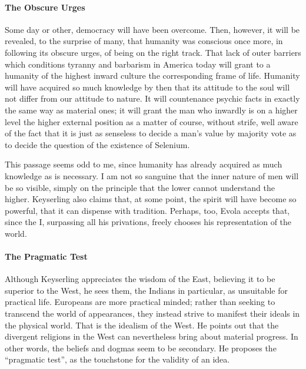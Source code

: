 \paragraph{The Obscure Urges}


\begin{quotex}
Some day or other, democracy will have been overcome. Then, however, it will be revealed, to the surprise of many, that humanity was conscious once more, in following its obscure urges, of being on the right track. That lack of outer barriers which conditions tyranny and barbarism in America today will grant to a humanity of the highest inward culture the corresponding frame of life. Humanity will have acquired so much knowledge by then that its attitude to the soul will not differ from our attitude to nature. It will countenance psychic facts in exactly the same way as material ones; it will grant the man who inwardly is on a higher level the higher external position as a matter of course, without strife, well aware of the fact that it is just as senseless to decide a man's value by majority vote as to decide the question of the existence of Selenium.
\end{quotex}


This passage seems odd to me, since humanity has already acquired as much knowledge as is necessary. I am not so sanguine that the inner nature of men will be so visible, simply on the principle that the lower cannot understand the higher. Keyserling also claims that, at some point, the spirit will have become so powerful, that it can dispense with tradition. Perhaps, too, Evola accepts that, since the I, surpassing all his privations, freely chooses his representation of the world.

\paragraph{The Pragmatic Test}


Although Keyserling appreciates the wisdom of the East, believing it to be superior to the West, he sees them, the Indians in particular, as unsuitable for practical life. Europeans are more practical minded; rather than seeking to transcend the world of appearances, they instead strive to manifest their ideals in the physical world. That is the idealism of the West. He points out that the divergent religions in the West can nevertheless bring about material progress. In other words, the beliefs and dogmas seem to be secondary. He proposes the ``pragmatic test'', as the touchstone for the validity of an idea.

